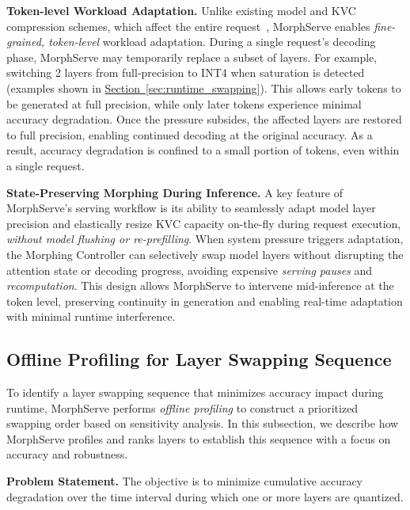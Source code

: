 \documentclass{article}
\newcommand{\system}{{MorphServe}\xspace}
\begin{document}
\noindent\textbf{Token-level Workload 
Adaptation.}
Unlike existing model and KVC compression schemes, which affect  
the entire request~\cite{model_compression_2018_iclr, lin2024awq, frantar2022gptq, lin2024duquant, zhao2024atom}, {\system} enables \emph{fine-grained, token-level} workload adaptation. 
During a single request’s decoding phase, {\system} may temporarily replace a subset of layers. For example, switching 2 layers from full-precision to INT4 when saturation is detected (examples shown in \hyperref[sec:runtime_swapping]{Section~\ref{sec:runtime_swapping}}). This allows early tokens to be generated at full precision, while only later tokens experience minimal accuracy degradation. Once the pressure subsides, the affected layers are restored to full precision, enabling continued decoding at the original accuracy. As a result, accuracy degradation is confined to a small portion of tokens, even within a single request. 

\noindent\textbf{State-Preserving Morphing During Inference.}
A key feature of {\system}’s serving workflow is its ability to seamlessly adapt model layer precision and elastically resize KVC capacity on-the-fly during request execution, 
\emph{without model flushing or re-prefilling}. 
When system pressure triggers adaptation, the Morphing Controller can selectively swap model layers without disrupting the attention state or decoding progress, avoiding expensive \textit{serving pauses} and \textit{recomputation}. 
This design allows {\system} to intervene mid-inference at the token level, preserving continuity in generation and enabling real-time adaptation with minimal runtime interference. 

\subsection{Offline Profiling for Layer Swapping Sequence}
\label{sec:offline_profiling}

To identify a layer swapping sequence that minimizes accuracy impact during runtime, {\system} performs \textit{offline profiling} to construct a prioritized swapping order based on sensitivity analysis. In this subsection, we describe how {\system} profiles and ranks layers to establish this sequence with a focus on accuracy and robustness.

\noindent\textbf{Problem Statement.} 
The objective is to minimize cumulative accuracy degradation over the time interval during which one or more layers are quantized.
\end{document}
